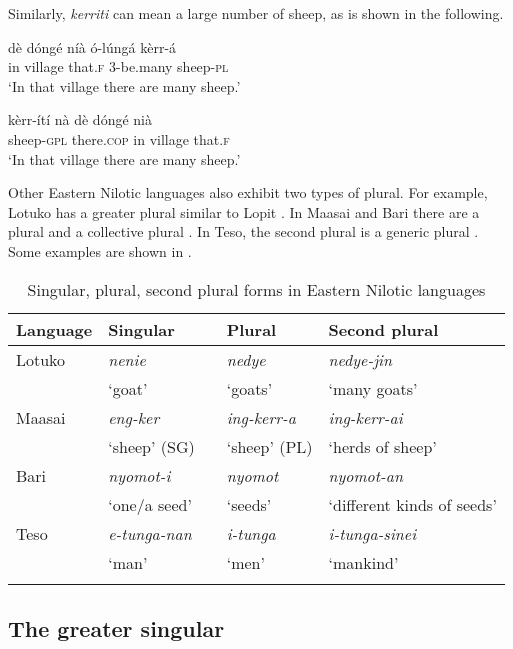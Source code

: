 \documentclass[output=paper]{langsci/langscibook}
\begin{document}
Similarly, \textit{kerriti} can mean a large number of sheep, as is shown in the following.

\ea\label{ex:moodie:6}
\gll dè dóngé níà ó-lúngá kèrr-á \\
in village that.\textsc{f} 3-be.many sheep-\textsc{pl} \\
\glt ‘In that village there are many sheep.’
\z

\ea\label{ex:moodie:7}
\gll kèrr-ítí nà dè dóngé nià\\
sheep-\textsc{gpl} there.\textsc{cop} in village that.\textsc{f} \\
\glt ‘In that village there are many sheep.’
\z

Other Eastern Nilotic languages also exhibit two types of plural. For example, Lotuko has a greater plural similar to Lopit \citep[57]{Muratori1938}. In Maasai and Bari there are a plural and a collective plural \citep[242]{Dimmendaal2000}. In Teso, the second plural is a generic plural \citep[4]{HildersLawrance1957}. Some examples are shown in . 

\begin{table}
\begin{tabularx}{\textwidth}{llp{1cm}lX}
\lsptoprule

 {Language} & {Singular} &  & {Plural} & {Second plural}\\ \midrule
Lotuko &  \textit{nenie} &  &  \textit{nedye} &  \textit{nedye-jin}\\
& ‘goat’ &  & ‘goats’ & ‘many goats’\\
\tablevspace
Maasai &  \textit{eng-ker} &  &  \textit{ing-kerr-a} &  \textit{ing-kerr-ai}\\
& ‘sheep’ (SG) &  & ‘sheep’ (PL) & ‘herds of sheep’\\
\tablevspace
Bari &  \textit{nyomot-i} &  &  \textit{nyomot} &  \textit{nyomot-an}\\
& ‘one/a seed’ &  & ‘seeds’ & ‘different kinds of seeds’\\
\tablevspace
Teso &  \textit{e-tunga-nan} &  &  \textit{i-tunga} &  \textit{i-tunga-sinei}\\
& ‘man’ &  & ‘men’ & ‘mankind’\\
\lspbottomrule
\end{tabularx}
\caption{Singular, plural, second plural forms in Eastern Nilotic languages}
\label{tab:moodie:18}
\end{table}

\subsection{The greater singular}\label{sec:moodie:5.2}
\end{document}
